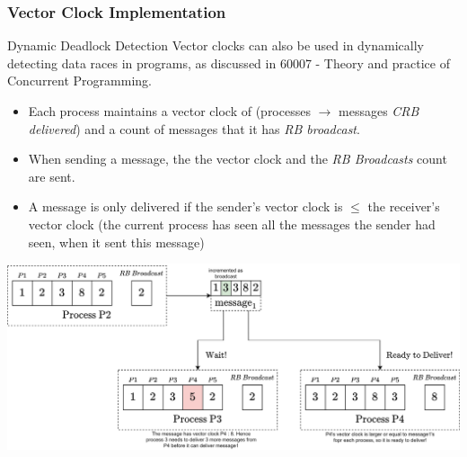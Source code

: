 \subsubsection{Vector Clock Implementation}
\begin{sidenotebox}{Dynamic Deadlock Detection}
    Vector clocks can also be used in dynamically detecting data races in programs, as discussed in 60007 - Theory and practice of Concurrent Programming.
\end{sidenotebox}
\begin{itemize}
    \item Each process maintains a vector clock of (processes $\to$ messages \textit{CRB delivered}) and a count of messages that it has \textit{RB broadcast}.
    \item When sending a message, the  the vector clock and the \textit{RB Broadcasts} count are sent.
    \item A message is only delivered if the sender's vector clock is $\leq$ the receiver's vector clock (the current process has seen all the messages the sender had seen, when it sent this message)
\end{itemize}
\begin{center}
    \includegraphics[width=.9\textwidth]{broadcast/images/causal_broadcast_vector_clocks.drawio.png}
\end{center}
\inputminted{elixir}{broadcast/code/causal_reliable_broadcast_vector_clock.ex}

